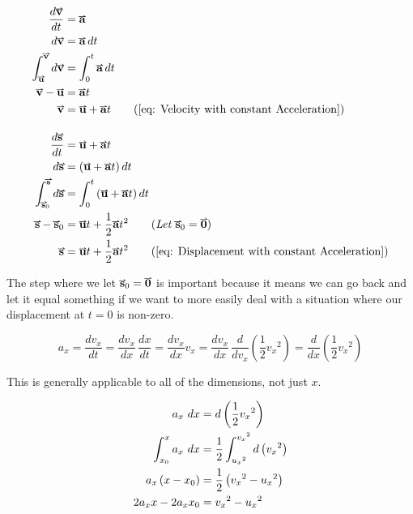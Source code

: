 \documentclass[main.tex]{subfiles}
\begin{document}
                \begin{align*}
                    \frac{d\vect{v}}{dt} &= \vect{a}\\
                    d\vect{v} &= \vect{a}\, dt\\
                    \int_{\vect{u}}^{\vect{v}} d\vect{v} &= \int_0^t \vect{a}\, dt\\
                    \vect{v} - \vect{u} &= \vect{a}t\\
                    \vect{v} &= \vect{u} + \vect{a}t \tag{\eqnum{eq: Velocity with constant Acceleration}}\\[1em]
                    \frac{d\vect{s}}{dt} &= \vect{u} + \vect{a}t\\
                    d\vect{s} &= \left(\vect{u} + \vect{a}t\right)dt\\
                    \int_{\vect{s}_0}^{\vect{s}} d\vect{s} &= \int_0^t \left(\vect{u} + \vect{a}t\right)dt\\
                    \vect{s} - \vect{s}_0 &= \vect{u}t + \frac{1}{2}\vect{a}t^2 \tag{\textit{Let $\vect{s}_0 = \vect{0}$}}\\
                    \vect{s} &= \vect{u}t + \frac{1}{2}\vect{a}t^2 \tag{\eqnum{eq: Displacement with constant Acceleration}}
                \end{align*}

                The step where we let $\vect{s}_0 = \vect{0}$ is important because it means we can go back and let it equal something if we want to more easily deal with a situation where our displacement at $t=0$ is non-zero.


                \newpage
                \begin{equation*}
                    a_x = \frac{dv_x}{dt} = \frac{dv_x}{dx}\,\frac{dx}{dt} = \frac{dv_x}{dx} v_x = \frac{dv_x}{dx}\,\frac{d}{dv_x}\left(\frac{1}{2}{v_x}^2\right) = \frac{d}{dx}\left(\frac{1}{2}{v_x}^2\right)
                \end{equation*}
                
                This is generally applicable to all of the dimensions, not just $x$.

                \begin{align*}
                    a_x \, \, d x &= d\left(\frac{1}{2}{v_x}^2\right)\\
                    \int_{x_0}^{x} a_x \, \, d x &= \frac{1}{2}\int_{{u_x}^2}^{{v_x}^2} d\left({v_x}^2\right)\\
                    a_x\left(x - x_0\right) &= \frac{1}{2}\left( {v_x}^2 - {u_x}^2 \right)\\
                    2a_x x - 2a_x x_0 &= {v_x}^2 - {u_x}^2
                \end{align*}
                \vspace{2em}
\end{document}
